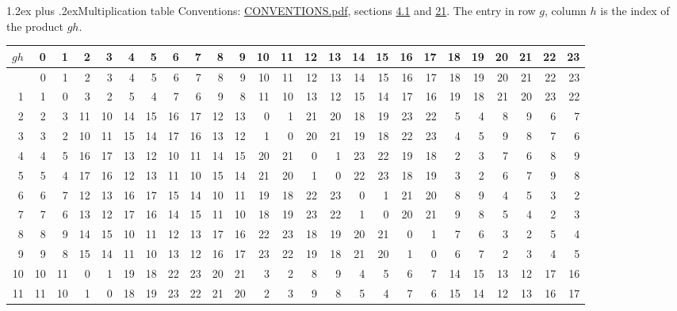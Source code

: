 \documentclass[10pt,a4paper]{article}
\makeatletter
\renewcommand\section{\@startsection{section}{1}{\z@}{-3ex plus -1ex minus -.2ex}%
  {1.2ex plus .2ex}{\normalfont\large\sffamily\bfseries\color{parttitle}}}
\numberwithin{equation}{section}
\makeatother
\begin{document}
\section{Multiplication table}\label{s:multiplication}
Conventions: \href{../../CONVENTIONS.pdf}{CONVENTIONS.pdf}, sections \href{../../../rotation/CONVENTIONS.pdf\#conv.4.1}{4.1} and \href{../../CONVENTIONS.pdf\#conv.21}{21}.
The entry in row $g$, column $h$ is the index of the product $gh$.
{\normalsize\setlength{\tabcolsep}{0.1em}\setlength{\LTleft}{-8pt plus 1fill}\setlength{\LTright}{-8pt plus 1fill}\begin{longtable}{@{}r|rrrrrrrrrrrrrrrrrrrrrrrr@{}}\toprule
$gh$ & 0 & 1 & 2 & 3 & 4 & 5 & 6 & 7 & 8 & 9 & 10 & 11 & 12 & 13 & 14 & 15 & 16 & 17 & 18 & 19 & 20 & 21 & 22 & 23\\\midrule\endhead
\bottomrule\endfoot\endlastfoot
0 & 0 & 1 & 2 & 3 & 4 & 5 & 6 & 7 & 8 & 9 & 10 & 11 & 12 & 13 & 14 & 15 & 16 & 17 & 18 & 19 & 20 & 21 & 22 & 23\\*
1 & 1 & 0 & 3 & 2 & 5 & 4 & 7 & 6 & 9 & 8 & 11 & 10 & 13 & 12 & 15 & 14 & 17 & 16 & 19 & 18 & 21 & 20 & 23 & 22\\
2 & 2 & 3 & 11 & 10 & 14 & 15 & 16 & 17 & 12 & 13 & 0 & 1 & 21 & 20 & 18 & 19 & 23 & 22 & 5 & 4 & 8 & 9 & 6 & 7\\
3 & 3 & 2 & 10 & 11 & 15 & 14 & 17 & 16 & 13 & 12 & 1 & 0 & 20 & 21 & 19 & 18 & 22 & 23 & 4 & 5 & 9 & 8 & 7 & 6\\
4 & 4 & 5 & 16 & 17 & 13 & 12 & 10 & 11 & 14 & 15 & 20 & 21 & 0 & 1 & 23 & 22 & 19 & 18 & 2 & 3 & 7 & 6 & 8 & 9\\
5 & 5 & 4 & 17 & 16 & 12 & 13 & 11 & 10 & 15 & 14 & 21 & 20 & 1 & 0 & 22 & 23 & 18 & 19 & 3 & 2 & 6 & 7 & 9 & 8\\
6 & 6 & 7 & 12 & 13 & 16 & 17 & 15 & 14 & 10 & 11 & 19 & 18 & 22 & 23 & 0 & 1 & 21 & 20 & 8 & 9 & 4 & 5 & 3 & 2\\
7 & 7 & 6 & 13 & 12 & 17 & 16 & 14 & 15 & 11 & 10 & 18 & 19 & 23 & 22 & 1 & 0 & 20 & 21 & 9 & 8 & 5 & 4 & 2 & 3\\
8 & 8 & 9 & 14 & 15 & 10 & 11 & 12 & 13 & 17 & 16 & 22 & 23 & 18 & 19 & 20 & 21 & 0 & 1 & 7 & 6 & 3 & 2 & 5 & 4\\
9 & 9 & 8 & 15 & 14 & 11 & 10 & 13 & 12 & 16 & 17 & 23 & 22 & 19 & 18 & 21 & 20 & 1 & 0 & 6 & 7 & 2 & 3 & 4 & 5\\
10 & 10 & 11 & 0 & 1 & 19 & 18 & 22 & 23 & 20 & 21 & 3 & 2 & 8 & 9 & 4 & 5 & 6 & 7 & 14 & 15 & 13 & 12 & 17 & 16\\
11 & 11 & 10 & 1 & 0 & 18 & 19 & 23 & 22 & 21 & 20 & 2 & 3 & 9 & 8 & 5 & 4 & 7 & 6 & 15 & 14 & 12 & 13 & 16 & 17\\

\end{longtable}}
\end{document}
